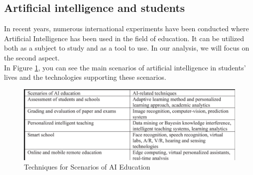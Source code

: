 \documentclass[a4paper,12pt]{article}
\begin{document}
\subsection{Artificial intelligence and students}
In recent years, numerous international experiments have been conducted where Artificial Intelligence has been used in the field of education. It can be utilized both as a subject to study and as a tool to use\cite{cesaretti2021intelligenza}. 
In our analysis, we will focus on the second aspect.
\\ \newline
In Figure \ref{fig:enter-label}, you can see the main scenarios of artificial intelligence in students' lives and the technologies supporting these scenarios.
 \begin{figure}
     \includegraphics[scale=0.8]{figure1.png}
     \caption{Techniques for Scenarios of AI Education \cite{ArtificialInInEd}}
     \label{fig:enter-label}
 \end{figure}

\end{document}
